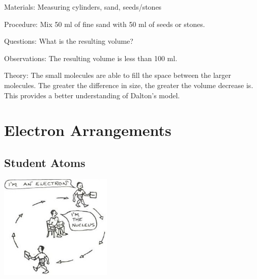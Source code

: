 \begin{multicols}{2}
\begin{description*}
\item[Materials:]{Measuring cylinders, sand, seeds/stones}
\item[Procedure:]{Mix 50 ml of fine sand with 50 ml of seeds
or stones.}
\item[Questions:]{What is the resulting volume?}
\item[Observations:]{The resulting volume is less than 100 ml.}
\item[Theory:]{The small molecules are able to fill the space
between the larger molecules. The greater the
difference in size, the greater the volume decrease
is. This provides a better understanding of
Dalton's model.}
\end{description*}


\section*{Electron Arrangements}


\subsection{Student Atoms}

\begin{center}
\includegraphics[width=0.4\textwidth]{./img/source/student-atom.jpg}
\end{center}


\end{multicols}
